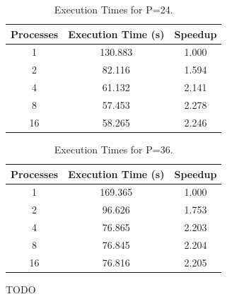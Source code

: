 \documentclass[10pt,twocolumn,letterpaper]{article}
\begin{document}
\begin{table}[H]
	\begin{center}
		\begin{tabular}{|c|c|c|}
			\hline
			Processes & Execution Time (s) & Speedup \\
			\hline
			1 & 130.883 & 1.000 \\
			2 & 82.116 & 1.594 \\
			4 & 61.132 & 2.141 \\
			8 & 57.453 & 2.278 \\
			16 & 58.265 & 2.246 \\
			\hline
		\end{tabular}
	\end{center}
	\caption{Execution Times for P=24.}
	\label{tab:speedup_k_3}
\end{table}

\begin{table}[H]
	\begin{center}
		\begin{tabular}{|c|c|c|}
			\hline
			Processes & Execution Time (s) & Speedup \\
			\hline
			1 & 169.365 & 1.000 \\
			2 & 96.626 & 1.753 \\
			4 & 76.865 & 2.203 \\
			8 & 76.845 & 2.204 \\
			16 & 76.816 & 2.205 \\
			\hline
		\end{tabular}
	\end{center}
	\caption{Execution Times for P=36.}
	\label{tab:speedup_k_4}
\end{table}

TODO
 
\end{document}
